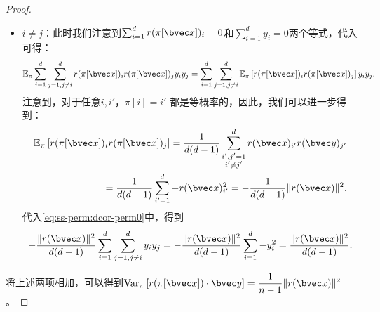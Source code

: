 \begin{proof}
\begin{itemize}
    \item $i \ne j$：此时我们注意到$\sum_{i=1}^d r(\pi[\bvec x])_i = 0$和$\sum_{i=1}^d y_i = 0$两个等式，代入可得：
    \begin{equation}
    \label{eq:ss-perm:dcor-perm0}
        \mathbb E_\pi \sum_{i=1}^d  \sum_{j = 1, j\ne i}^d r(\pi[\bvec x])_i r(\pi[\bvec x])_j y_i y_j = \sum_{i=1}^d  \sum_{j = 1, j\ne i}^d \mathbb E_\pi \left[ r(\pi[\bvec x])_i r(\pi[\bvec x])_j \right] y_i y_j.
    \end{equation}
    注意到，对于任意$i, i'$，$\pi[i] = i'$ 都是等概率的，因此，我们可以进一步得到：
    \begin{equation}
    \begin{split}
        \mathbb E_\pi \left[ r(\pi[\bvec x])_i r(\pi[\bvec x])_j \right] = \dfrac{1}{d(d-1)}\sum_{\substack{i',j'=1\\i'\ne j'}}^d r(\bvec x)_{i'} r(\bvec y)_{j'} \\
        = \dfrac{1}{d(d-1)}\sum_{i'=1}^d -r(\bvec x)_{i'}^2  = -\dfrac{1}{d(d-1)}\Vert r(\bvec x) \Vert^2.
    \end{split}
    \end{equation}
    代入\autoref{eq:ss-perm:dcor-perm0}中，得到
    \begin{equation}
        -\dfrac{\Vert r(\bvec x) \Vert^2 }{d(d-1)}\sum_{i=1}^d  \sum_{j = 1, j\ne i}^d y_i y_j = -\dfrac{\Vert r(\bvec x) \Vert^2 }{d(d-1)}\sum_{i=1}^d -y_i^2 = \dfrac{\Vert r(\bvec x) \Vert^2 }{d(d-1)}.
    \end{equation}
\end{itemize}
将上述两项相加，可以得到$\textnormal{Var}_\pi \left[ r(\pi[\bvec x])\cdot \bvec y \right] = \dfrac{1}{n - 1} \Vert r(\bvec x) \Vert^2$。
\end{proof}


